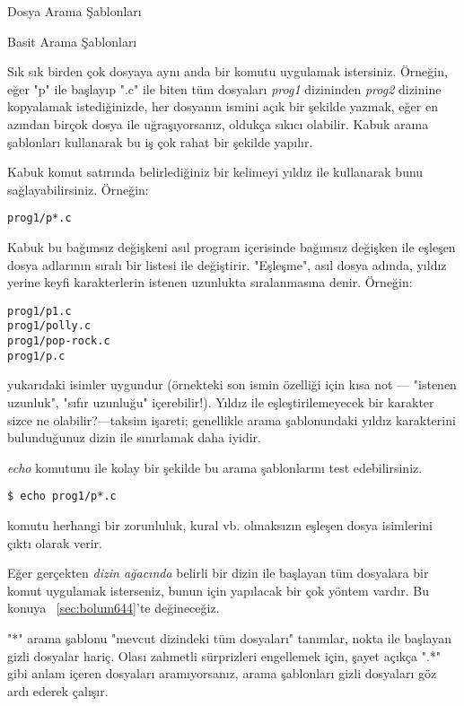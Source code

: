 \begin{section}{Dosya Arama Şablonları}
\label{sec:bolum63}
\begin{subsection}{Basit Arama Şablonları}

Sık sık birden çok dosyaya aynı anda bir komutu uygulamak istersiniz. Örneğin, eğer "p" ile başlayıp ".c" ile biten tüm dosyaları \emph{prog1} dizininden \emph{prog2} dizinine kopyalamak istediğinizde, her dosyanın ismini açık bir şekilde yazmak, eğer en azından birçok dosya ile uğraşıyorsanız, oldukça sıkıcı olabilir. Kabuk arama şablonları kullanarak bu iş çok rahat bir şekilde yapılır.

Kabuk komut satırında belirlediğiniz bir kelimeyi yıldız ile kullanarak bunu sağlayabilirsiniz. Örneğin:
\footnotesize 
\begin{verbatim}
prog1/p*.c
\end{verbatim}
\normalsize 
Kabuk bu bağımsız değişkeni asıl program içerisinde bağımsız değişken ile eşleşen dosya adlarının sıralı bir listesi ile değiştirir. "Eşleşme", asıl dosya adında, yıldız yerine keyfi karakterlerin istenen uzunlukta sıralanmasına denir. Örneğin:
\footnotesize 
\begin{verbatim}
prog1/p1.c
prog1/polly.c
prog1/pop-rock.c
prog1/p.c
\end{verbatim}
\normalsize 
yukarıdaki isimler uygundur (örnekteki son ismin özelliği için kısa not — "istenen uzunluk", "sıfır uzunluğu" içerebilir!). Yıldız ile eşleştirilemeyecek bir karakter sizce ne olabilir?—taksim işareti; genellikle arama şablonundaki yıldız karakterini bulunduğunuz dizin ile sınırlamak daha iyidir.

\emph{echo} komutunu ile kolay bir şekilde bu arama şablonlarını test edebilirsiniz.
\footnotesize 
\begin{verbatim}
$ echo prog1/p*.c
\end{verbatim}
\normalsize
komutu herhangi bir zorunluluk, kural vb. olmaksızın eşleşen dosya isimlerini çıktı olarak verir.

Eğer gerçekten \emph{dizin ağacında} belirli bir dizin ile başlayan tüm dosyalara bir komut uygulamak isterseniz, bunun için yapılacak bir çok yöntem vardır. Bu konuya ~\ref{sec:bolum644}'te değineceğiz.

"*" arama şablonu "mevcut dizindeki tüm dosyaları" tanımlar, nokta ile başlayan gizli dosyalar hariç. Olası zahmetli sürprizleri engellemek için, şayet açıkça ".*" gibi anlam içeren dosyaları aramıyorsanız, arama şablonları gizli dosyaları göz ardı ederek çalışır.


\end{subsection}
\end{section}
